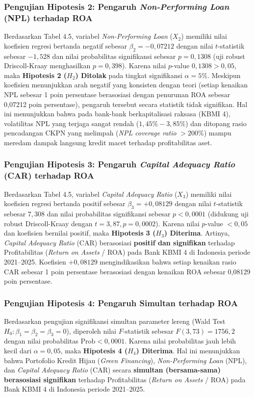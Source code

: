 \documentclass[12pt,a4paper]{article}
\numberwithin{equation}{section}
\begin{document}
\subsubsection{Pengujian Hipotesis 2: Pengaruh \emph{Non-Performing Loan} (NPL) terhadap ROA}
\noindent
Berdasarkan Tabel 4.5, variabel \emph{Non-Performing Loan} ($X_2$) memiliki nilai koefisien regresi bertanda negatif sebesar $\beta_2 = -0{,}07212$ dengan nilai $t$-statistik sebesar $-1{,}528$ dan nilai probabilitas signifikansi sebesar $p = 0{,}1308$ (uji robust Driscoll-Kraay menghasilkan $p = 0{,}398$). Karena nilai $p$-value $0{,}1308 > 0{,}05$, maka \textbf{Hipotesis 2 ($H_2$) Ditolak} pada tingkat signifikansi $\alpha = 5\%$. Meskipun koefisien menunjukkan arah negatif yang konsisten dengan teori (setiap kenaikan NPL sebesar 1 poin persentase berasosiasi dengan penurunan ROA sebesar 0,07212 poin persentase), pengaruh tersebut secara statistik tidak signifikan. Hal ini menunjukkan bahwa pada bank-bank berkapitalisasi raksasa (KBMI 4), volatilitas NPL yang terjaga sangat rendah ($1{,}45\% - 3{,}85\%$) dan ditopang rasio pencadangan CKPN yang melimpah (\emph{NPL coverage ratio} $> 200\%$) mampu meredam dampak langsung kredit macet terhadap profitabilitas aset.

\subsubsection{Pengujian Hipotesis 3: Pengaruh \emph{Capital Adequacy Ratio} (CAR) terhadap ROA}
\noindent
Berdasarkan Tabel 4.5, variabel \emph{Capital Adequacy Ratio} ($X_3$) memiliki nilai koefisien regresi bertanda positif sebesar $\beta_3 = +0{,}08129$ dengan nilai $t$-statistik sebesar $7{,}308$ dan nilai probabilitas signifikansi sebesar $p < 0{,}0001$ (didukung uji robust Driscoll-Kraay dengan $t = 3{,}87, p = 0{,}0002$). Karena nilai $p$-value $< 0{,}05$ dan koefisien bernilai positif, maka \textbf{Hipotesis 3 ($H_3$) Diterima}. Artinya, \emph{Capital Adequacy Ratio} (CAR) berasosiasi \textbf{positif dan signifikan} terhadap Profitabilitas (\emph{Return on Assets} / ROA) pada Bank KBMI 4 di Indonesia periode 2021--2025. Koefisien $+0{,}08129$ mengindikasikan bahwa setiap kenaikan rasio CAR sebesar 1 poin persentase berasosiasi dengan kenaikan ROA sebesar 0,08129 poin persentase.

\subsubsection{Pengujian Hipotesis 4: Pengaruh Simultan terhadap ROA}
\noindent
Berdasarkan pengujian signifikansi simultan parameter lereng (Wald Test $H_0: \beta_1 = \beta_2 = \beta_3 = 0$), diperoleh nilai $F$-statistik sebesar $F(3, 73) = 1756{,}2$ dengan nilai probabilitas $\text{Prob} < 0{,}0001$. Karena nilai probabilitas jauh lebih kecil dari $\alpha = 0{,}05$, maka \textbf{Hipotesis 4 ($H_4$) Diterima}. Hal ini menunjukkan bahwa Portofolio Kredit Hijau (\emph{Green Financing}), \emph{Non-Performing Loan} (NPL), dan \emph{Capital Adequacy Ratio} (CAR) secara \textbf{simultan (bersama-sama) berasosiasi signifikan} terhadap Profitabilitas (\emph{Return on Assets} / ROA) pada Bank KBMI 4 di Indonesia periode 2021--2025.
\end{document}
